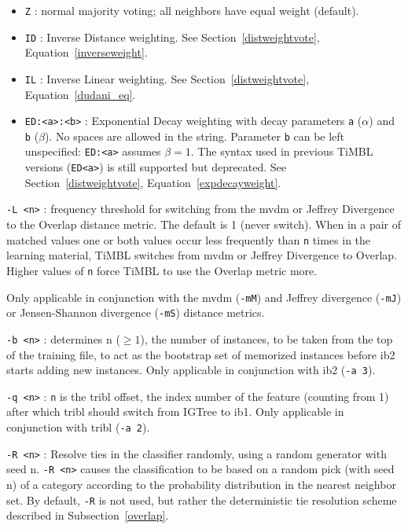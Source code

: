 \documentclass{book}
\begin{document}
\begin{description}
\begin{itemize}
  	\item {\tt Z} : normal majority voting; all neighbors have
         equal weight (default).

  	\item {\tt ID} : Inverse Distance weighting. See
  	Section~\ref{distweightvote}, Equation~\ref{inverseweight}.

  	\item {\tt IL} : Inverse Linear weighting. See
  	Section~\ref{distweightvote}, Equation~\ref{dudani_eq}.

  	\item {\tt ED:<a>:<b>} : Exponential Decay weighting with decay
  	parameters {\tt a} ($\alpha$) and {\tt b} ($\beta$). No spaces
  	are allowed in the string. Parameter {\tt b} can be left
  	unspecified: {\tt ED:<a>} assumes $\beta=1$. The syntax used
  	in previous TiMBL versions ({\tt ED<a>}) is still supported
  	but deprecated. See Section~\ref{distweightvote},
  	Equation~\ref{expdecayweight}.

\end{itemize}

\item {\tt -L <n>} : frequency threshold for switching from the {\sc
    mvdm} or Jeffrey Divergence to the Overlap distance metric. The
  default is 1 (never switch). When in a pair of matched values one or
  both values occur less frequently than {\tt n} times in the learning
  material, TiMBL switches from {\sc mvdm} or Jeffrey Divergence to
  Overlap. Higher values of {\tt n} force TiMBL to use the Overlap
  metric more.

 Only applicable in conjunction with the {\sc mvdm}
  ({\tt -mM}) and Jeffrey divergence ({\tt -mJ}) or Jensen-Shannon
  divergence ({\tt -mS}) distance metrics.

\item {\tt -b <n>} : determines n ($\geq 1$), the number of instances,
to be taken from the top of the training file, to act as the bootstrap
set of memorized instances before {\sc ib2} starts adding new
instances. Only applicable in conjunction with {\sc ib2} ({\tt -a 3}).

\item {\tt -q <n>} : {\tt n} is the {\sc tribl} offset, the index
number of the feature (counting from 1) after which {\sc tribl} should
switch from {\sc IGTree} to {\sc ib1}. Only applicable in conjunction
with {\sc tribl} ({\tt -a 2}).

\item {\tt -R <n>} : Resolve ties in the classifier randomly, using a
random generator with seed n. {\tt -R <n>} causes the classification
to be based on a random pick (with seed n) of a category according to
the probability distribution in the nearest neighbor set. By default,
{\tt -R} is not used, but rather the deterministic tie resolution
scheme described in Subsection~\ref{overlap}.


\end{description}
\end{document}
